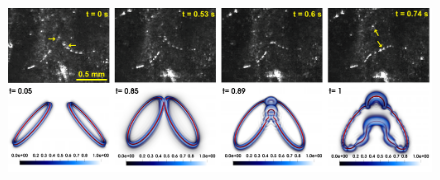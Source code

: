 \documentclass[9pt,twocolumn,twoside]{pnas-new}
\begin{document}
\begin{figure}
	 \centering
	\includegraphics*[width=\textwidth]{snaps-combined.pdf}

\end{figure}
\end{document}
